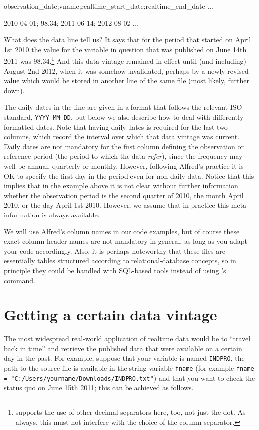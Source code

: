 \begin{code}
observation_date;vname;realtime_start_date;realtime_end_date
...

2010-04-01; 98.34; 2011-06-14; 2012-08-02
...
\end{code}

What does the data line tell us? It says that for the period that
started on April 1st 2010 the value for the variable in question that
was published on June 14th 2011 was 98.34.\footnote{
  supports the use of other decimal separators here, too, not just the
  dot. As always, this must not interfere with the choice of the
  column separator.} And this data vintage remained in effect until
(and including) August 2nd 2012, when it was somehow invalidated,
perhaps by a newly revised value which would be stored in another line
of the same file (most likely, further down).

The daily dates in the line are given in a format that follows the
relevant ISO standard, \texttt{YYYY-MM-DD}, but below we also describe
how to deal with differently formatted dates. Note that having daily
dates is required for the last two columns, which record the interval
over which that data vintage was current. Daily dates are not
mandatory for the first column defining the observation or reference
period (the period to which the data \textit{refer}), since the
frequency may well be annual, quarterly or monthly. However, following
Alfred's practice it is OK to specify the first day in the period even
for non-daily data. Notice that this implies that in the example above
it is not clear without further information whether the observation
period is the second quarter of 2010, the month April 2010, or the
day April 1st 2010.  However, we assume that in practice this meta
information is always available.

We will use Alfred's column names in our code examples, but of course
these exact column header names are not mandatory in general, as long
as you adapt your code accordingly. Also, it is perhaps noteworthy
that these files are essentially tables structured according to
relational-database concepts, so in principle they could be handled
with SQL-based tools instead of using 's 
command.

\section{Getting a certain data vintage }

The most widespread real-world application of realtime data would be
to ``travel back in time'' and retrieve the published data that were
available on a certain day in the past. For example, suppose that your
variable is named \texttt{INDPRO}, the path to the source file is
available in the string variable \texttt{fname} (for example
\verb|fname = "C:/Users/yourname/Downloads/INDPRO.txt"|) and that you
want to check the status quo on June 15th 2011; this can be achieved
as follows.

